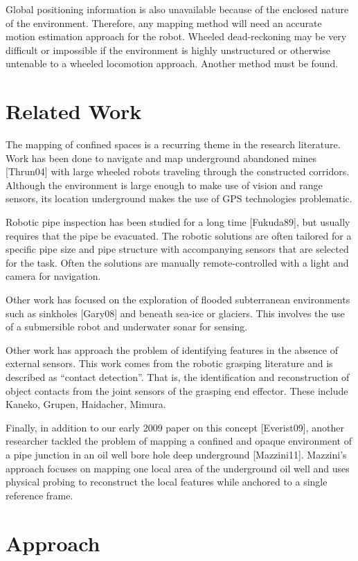 Global positioning information is also unavailable because of the enclosed nature of the environment.  Therefore, any mapping method will need an accurate motion estimation approach for the robot.  Wheeled dead-reckoning may be very difficult or impossible if the environment is highly unstructured or otherwise untenable to a wheeled locomotion approach.  Another method must be found.

\section{Related Work}

The mapping of confined spaces is a recurring theme in the research literature.  Work has been done to navigate and map underground abandoned mines [Thrun04] with large wheeled robots traveling through the constructed corridors.  Although the environment is large enough to make use of vision and range sensors, its location underground makes the use of GPS technologies problematic.  

Robotic pipe inspection has been studied for a long time [Fukuda89], but usually requires that the pipe be evacuated. The robotic solutions are often tailored for a specific pipe size and pipe structure with accompanying sensors that are selected for the task.  Often the solutions are manually remote-controlled with a light and camera for navigation.

Other work has focused on the exploration of flooded subterranean environments such as sinkholes [Gary08] and beneath sea-ice or glaciers.  This involves the use of a submersible robot and underwater sonar for sensing.

Other work has approach the problem of identifying features in the absence of external sensors.  This work comes from the robotic grasping literature and is described as “contact detection”.  That is, the identification and reconstruction of object contacts from the joint sensors of the grasping end effector.  These include Kaneko, Grupen, Haidacher, Mimura.

Finally, in addition to our early 2009 paper on this concept [Everist09], another researcher tackled the problem of mapping a confined and opaque environment of a pipe junction in an oil well bore hole deep underground [Mazzini11].  Mazzini’s approach focuses on mapping one local area of the underground oil well and uses physical probing to reconstruct the local features while anchored to a single reference frame.  
 
\section{Approach}


